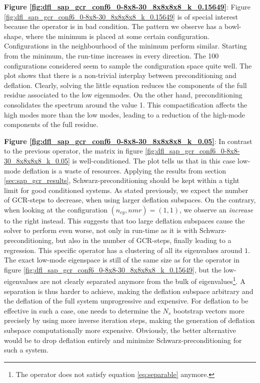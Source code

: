 \documentclass{article}
\theoremstyle{plain} %
\theoremstyle{convention} %
\theoremstyle{remark} %
\numberwithin{equation}{section}
\begin{document}
\textbf{Figure \ref{fig:dfl_sap_gcr_conf6_0-8x8-30_8x8x8x8_k_0.15649}}: Figure \ref{fig:dfl_sap_gcr_conf6_0-8x8-30_8x8x8x8_k_0.15649} is of special interest because the operator is in bad condition. The pattern we observe has a bowl-shape, where the minimum is placed at some certain configuration. Configurations in the neighbourhood of the minimum perform similar. Starting from the minimum, the run-time increases in every direction. The \num{100} configurations considered seem to sample the configuration space quite well. The plot shows that there is a non-trivial interplay between preconditioning and deflation. Clearly, solving the little equation reduces the components of the full residue associated to the low eigenmodes. On the other hand, preconditioning consolidates the spectrum around the value \num{1}. This compactification affects the high modes more than the low modes, leading to a reduction of the high-mode components of the full residue.

\textbf{Figure \ref{fig:dfl_sap_gcr_conf6_0-8x8-30_8x8x8x8_k_0.05}}: In contrast to the previous operator, the matrix in figure \ref{fig:dfl_sap_gcr_conf6_0-8x8-30_8x8x8x8_k_0.05} is well-conditioned. The plot tells us that in this case low-mode deflation is a waste of resources. Applying the results from section \ref{sec:sap_gcr_results}, Schwarz-preconditioning should be kept within a tight limit for good conditioned systems. As stated previously, we expect the number of GCR-steps to decrease, when using larger deflation subspaces. On the contrary, when looking at the configuration $(n_{cy},n{mr}) = (1,1)$, we observe an \textit{increase} to the right instead. This suggests that too large deflation subspaces cause the solver to perform even worse, not only in run-time as it is with Schwarz-preconditioning, but also in the number of GCR-steps, finally leading to a regression. This specific operator has a clustering of all its eigenvalues around $1$. The exact low-mode eigenspace is still of the same size as for the operator in figure \ref{fig:dfl_sap_gcr_conf6_0-8x8-30_8x8x8x8_k_0.15649}, but the low-eigenvalues are not clearly separated anymore from the bulk of eigenvalues\footnote{The operator does not satisfy equation \eqref{eq:separable} anymore.}. A separation is thus harder to achieve, making the deflation subspace arbitrary and the deflation of the full system unprogressive and expensive. For deflation to be effective in such a case, one needs to determine the $N_s$ bootstrap vectors more precisely by using more inverse iteration steps, making the generation of deflation subspace computationally more expensive. Obviously, the better alternative would be to drop deflation entirely and minimize Schwarz-preconditioning for such a system.
\end{document}

